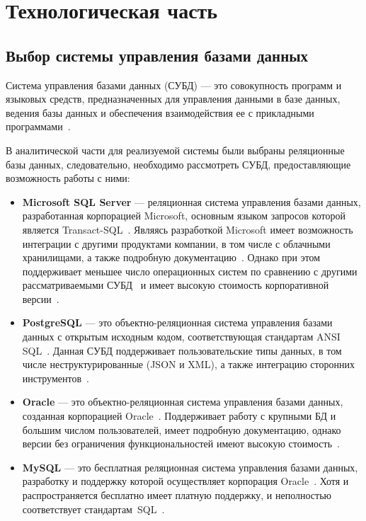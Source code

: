 \chapter{\label{impl}Технологическая часть}

\section{Выбор системы управления базами данных}

Система управления базами данных (СУБД) --- это совокупность программ и языковых
средств, предназначенных для управления данными в базе данных, ведения базы
данных и обеспечения взаимодействия ее с прикладными программами~\cite{gost01}.

В аналитической части для реализуемой системы были выбраны реляционные
базы данных, следовательно, необходимо рассмотреть СУБД, предоставляющие
возможность работы с ними:
\begin{itemize}
    \item \textbf{Microsoft SQL Server} --- реляционная система управления
        базами данных, разработанная корпорацией Microsoft, основным языком
        запросов которой является Transact-SQL~\cite{art06}. Являясь разработкой
        Microsoft имеет возможность интеграции с другими продуктами компании, в
        том числе с облачными хранилищами, а также подробную
        документацию~\cite{site10}. Однако при этом поддерживает меньшее число
        операционных систем по сравнению с другими рассматриваемыми
        СУБД~\cite{art07} и имеет высокую стоимость корпоративной
        версии~\cite{site11}.
    \item \textbf{PostgreSQL} --- это объектно-реляционная система управления
        базами данных с открытым исходным кодом, соответствующая стандартам ANSI
        SQL~\cite{site08}.  Данная СУБД поддерживает пользовательские типы
        данных, в том числе неструктурированные (JSON и XML), а также интеграцию
        сторонних инструментов~\cite{site12}.
    \item \textbf{Oracle} --- это объектно-реляционная система управления базами
        данных, созданная корпорацией Oracle~\cite{site09}. Поддерживает работу
        с крупными БД и большим числом пользователей, имеет подробную
        документацию, однако версии без ограничения функциональностей имеют
        высокую стоимость~\cite{site13}.
    \item \textbf{MySQL} --- это бесплатная реляционная система управления
        базами данных, разработку и поддержку которой осуществляет корпорация
        Oracle~\cite{art06}.  Хотя и распространяется бесплатно имеет платную
        поддержку, и неполностью соответствует стандартам~SQL~\cite{site12}.
\end{itemize}

